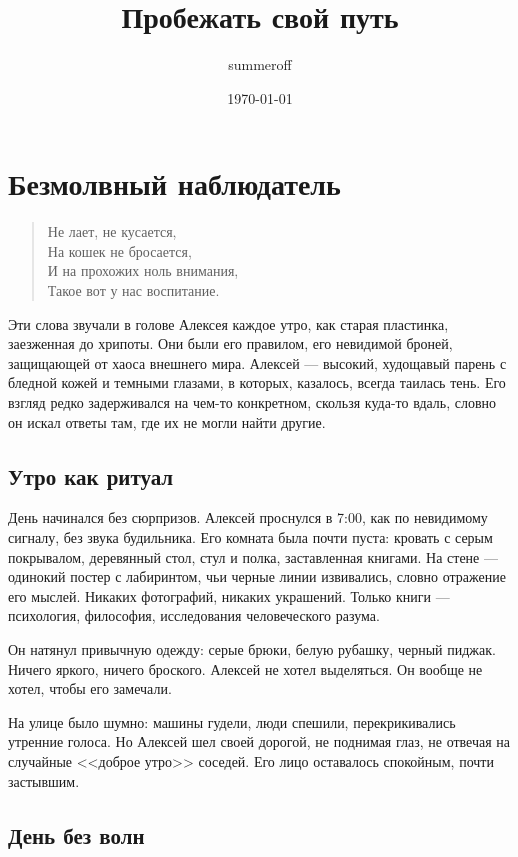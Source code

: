 \documentclass[12pt,a4paper]{book}
\title{Пробежать свой путь}
\author{summeroff}
\date{\today}
\begin{document}
\maketitle
\tableofcontents

\chapter{Безмолвный наблюдатель}

\begin{verse}
Не лает, не кусается,\\
На кошек не бросается,\\
И на прохожих ноль внимания,\\
Такое вот у нас воспитание.
\end{verse}

Эти слова звучали в голове Алексея каждое утро, как старая пластинка, заезженная до хрипоты. Они были его правилом, его невидимой броней, защищающей от хаоса внешнего мира. Алексей --- высокий, худощавый парень с бледной кожей и темными глазами, в которых, казалось, всегда таилась тень. Его взгляд редко задерживался на чем-то конкретном, скользя куда-то вдаль, словно он искал ответы там, где их не могли найти другие.

\section{Утро как ритуал}

День начинался без сюрпризов. Алексей проснулся в 7:00, как по невидимому сигналу, без звука будильника. Его комната была почти пуста: кровать с серым покрывалом, деревянный стол, стул и полка, заставленная книгами. На стене --- одинокий постер с лабиринтом, чьи черные линии извивались, словно отражение его мыслей. Никаких фотографий, никаких украшений. Только книги --- психология, философия, исследования человеческого разума.

Он натянул привычную одежду: серые брюки, белую рубашку, черный пиджак. Ничего яркого, ничего броского. Алексей не хотел выделяться. Он вообще не хотел, чтобы его замечали.

На улице было шумно: машины гудели, люди спешили, перекрикивались утренние голоса. Но Алексей шел своей дорогой, не поднимая глаз, не отвечая на случайные <<доброе утро>> соседей. Его лицо оставалось спокойным, почти застывшим.

\section{День без волн}
\end{document}
